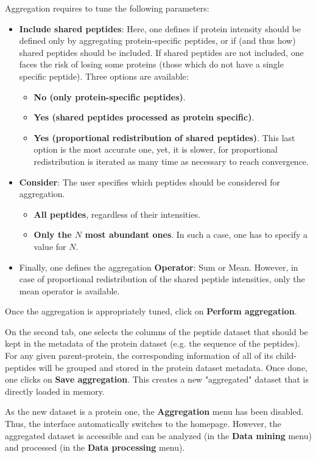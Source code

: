 \documentclass[12pt]{article}
\begin{document}
Aggregation requires to tune the following parameters:
\begin{itemize}
	\item \textbf{Include shared peptides}: Here, one defines if protein intensity should be defined only by aggregating protein-specific peptides, or if (and thus how) shared peptides should be included. If shared peptides are not included, one faces the risk of losing some proteins (those which do not have a single specific peptide). Three options are available:
	\begin{itemize}
		\item \textbf{No (only protein-specific peptides)}.
		\item \textbf{Yes (shared peptides processed as protein specific)}.
		\item \textbf{Yes (proportional redistribution of shared peptides)}. This last option is the most accurate one, yet, it is slower, for proportional redistribution is iterated as many time as necessary to reach convergence.
	\end{itemize}
	\item \textbf{Consider}: The user specifies which peptides should be considered for aggregation.
	\begin{itemize}
		\item \textbf{All peptides}, regardless of their intensities.
		\item \textbf{Only the $N$ most abundant ones}. In such a case, one has to specify a value for $N$.
	\end{itemize}
	\item Finally, one defines the aggregation \textbf{Operator}: Sum or Mean. However, in case of proportional redistribution of the shared peptide intensities, only the mean operator is available.
\end{itemize}
 
Once the aggregation is appropriately tuned, click on \textbf{Perform aggregation}.

On the second tab, one selects the columns of the peptide dataset that 
should be kept in the metadata of the protein dataset (e.g. the 
sequence of the peptides). For any 
given parent-protein, the corresponding information of all of its child-peptides  
will be grouped and stored in the protein dataset metadata. Once done, one clicks 
on \textbf{Save aggregation}. This creates a new "aggregated" dataset that
is directly loaded in memory. 

As the new dataset is a protein one, the \textbf{Aggregation} menu has been disabled. 
Thus, the interface automatically switches to the homepage. However, the aggregated 
dataset is accessible and can be analyzed (in the \textbf{Data mining} menu) and processed (in
the \textbf{Data processing} menu).
\end{document}
